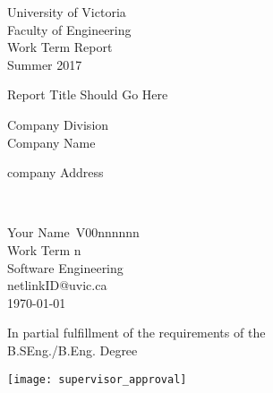 \begin{center}
University of Victoria\\
Faculty of Engineering\\
Work Term Report\\
Summer 2017
\vspace{1cm}

{\huge Report Title Should Go Here}\\
\vspace{1cm}

Company Division\\
Company Name\\
\begin{CJK}{UTF8}{min}company Address\end{CJK} \\ %


\vspace{1cm}

Your Name\
V00nnnnnn\\
Work Term n\\
Software Engineering\\
netlinkID@uvic.ca\\
\today \\
\vspace{1cm}

In partial fulfillment of the requirements of the\\
B.SEng./B.Eng. Degree\\
\vspace{2cm}

\texttt{[image: supervisor\_approval]}
\end{center}
